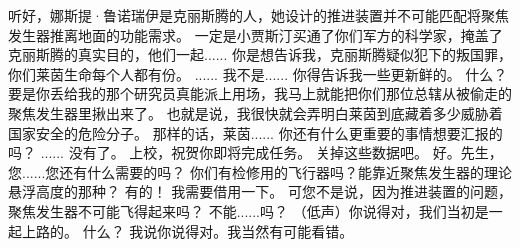 \documentclass[openany]{book}
\begin{document}
\begin{dialogue}
     听好，娜斯提·鲁诺瑞伊是克丽斯腾的人，她设计的推进装置并不可能匹配将聚焦发生器推离地面的功能需求。
     一定是小贾斯汀买通了你们军方的科学家，掩盖了克丽斯腾的真实目的，他们一起......
     你是想告诉我，克丽斯腾疑似犯下的叛国罪，你们莱茵生命每个人都有份。
     ......
     我不是......
     你得告诉我一些更新鲜的。
     什么？
     要是你丢给我的那个研究员真能派上用场，我马上就能把你们那位总辖从被偷走的聚焦发生器里揪出来了。
     也就是说，我很快就会弄明白莱茵到底藏着多少威胁着国家安全的危险分子。
     那样的话，莱茵......
     你还有什么更重要的事情想要汇报的吗？
     ......
     没有了。
     上校，祝贺你即将完成任务。
     关掉这些数据吧。
     好。先生，您......您还有什么需要的吗？
     你们有检修用的飞行器吗？能靠近聚焦发生器的理论悬浮高度的那种？
     有的！
     我需要借用一下。
     可您不是说，因为推进装置的问题，聚焦发生器不可能飞得起来吗？
     不能......吗？
     （低声）你说得对，我们当初是一起上路的。
     什么？
     我说你说得对。我当然有可能看错。
\end{dialogue}
\end{document}
